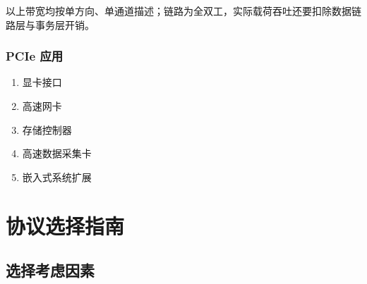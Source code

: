 以上带宽均按单方向、单通道描述；链路为全双工，实际载荷吞吐还要扣除数据链路层与事务层开销。

\subsubsection{PCIe 应用}

\begin{enumerate}
  \item 显卡接口
  \item 高速网卡
  \item 存储控制器
  \item 高速数据采集卡
  \item 嵌入式系统扩展
\end{enumerate}

\section{协议选择指南}

\subsection{选择考虑因素}

